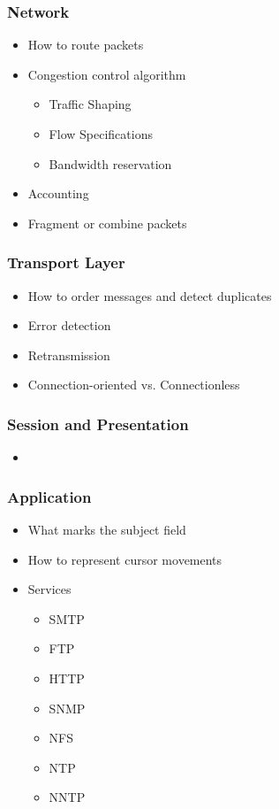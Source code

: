 \subsubsection{Network}\label{subsubsec:Network_Protocols}
\begin{itemize}
\item How to route packets
\item Congestion control algorithm
\begin{itemize}
\item Traffic Shaping
\item Flow Specifications
\item Bandwidth reservation
\end{itemize}
\item Accounting
\item Fragment or combine packets
\end{itemize}

\subsubsection{Transport Layer}\label{subsubsec:Transport_Layer_Protocols}
\begin{itemize}
\item How to order messages and detect duplicates
\item Error detection
\item Retransmission
\item Connection-oriented vs. Connectionless
\end{itemize}

\subsubsection{Session and Presentation}\label{subsubsec:Session_Presentation_Protocols}
\begin{itemize}
\item
\end{itemize}

\subsubsection{Application}\label{subsubsec:Application_Protocols}
\begin{itemize}
\item What marks the subject field
\item How to represent cursor movements
\item Services
\begin{itemize}
\item SMTP
\item FTP
\item HTTP
\item SNMP
\item NFS
\item NTP
\item NNTP
\end{itemize}
\end{itemize}


